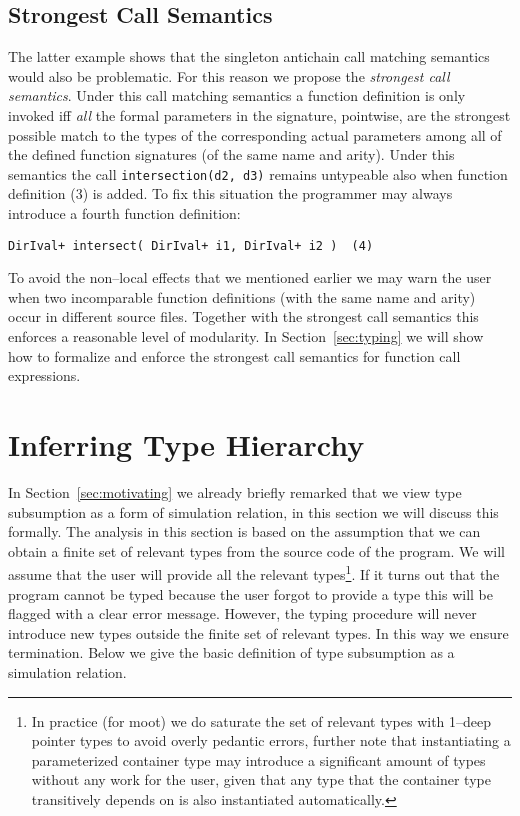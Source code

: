 \documentclass{sigplanconf}
\begin{document}
\subsection{Strongest Call Semantics}\label{sec:strongestcall}

The latter example shows that the singleton antichain call matching
semantics would also be problematic. For this reason we propose the
\emph{strongest call semantics}. Under this call matching semantics a
function definition is only invoked iff \emph{all} the formal
parameters in the signature, pointwise, are the strongest possible
match to the types of the corresponding actual parameters among all of
the defined function signatures (of the same name and arity). Under
this semantics the call \verb+intersection(d2, d3)+ remains untypeable
also when function definition (3) is added. To fix this situation the
programmer may always introduce a fourth function definition:
\begin{samepage}
\begin{verbatim}
DirIval+ intersect( DirIval+ i1, DirIval+ i2 )  (4)
\end{verbatim}
\end{samepage}
To avoid the non--local effects that we mentioned earlier we may warn
the user when two incomparable function definitions (with the same
name and arity) occur in different source files. Together with the
strongest call semantics this enforces a reasonable level of
modularity.
In Section~\ref{sec:typing} we will show how to formalize and enforce
the strongest call semantics for function call expressions.

\section{Inferring Type Hierarchy}\label{sec:types}

In Section~\ref{sec:motivating} we already briefly remarked that we
view type subsumption as a form of simulation relation, in this
section we will discuss this formally. The analysis in this section is
based on the assumption that we can obtain a finite set of relevant
types from the source code of the program. We will assume that the
user will provide all the relevant types\footnote{In practice (for
  {\sc moot}) we do saturate the set of relevant types with 1--deep
  pointer types to avoid overly pedantic errors, further note that
  instantiating a parameterized container type may introduce a
  significant amount of types without any work for the user, given
  that any type that the container type transitively depends on is
  also instantiated automatically.}. If it turns out that the program
cannot be typed because the user forgot to provide a type this will be
flagged with a clear error message. However, the typing procedure will
never introduce new types outside the finite set of relevant types. In
this way we ensure termination. Below we give the basic definition of
type subsumption as a simulation relation.
\end{document}
